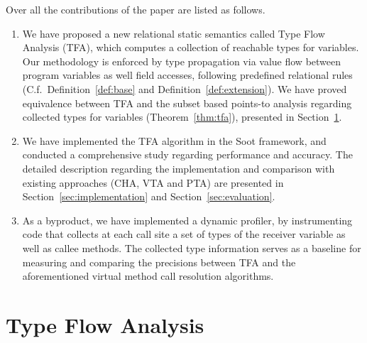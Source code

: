 \documentclass{fac}
\begin{document}
Over all the contributions of the paper are listed as follows.
\begin{enumerate}
  \item We have proposed a new relational static semantics called Type Flow Analysis (TFA), which computes a collection of reachable types for variables. Our methodology is enforced by type propagation via value flow between program variables as well field accesses, following predefined relational rules (C.f.~Definition~\ref{def:base} and Definition~\ref{def:extension}). We have proved equivalence between TFA and the subset based points-to analysis regarding collected types for variables (Theorem~\ref{thm:tfa}), presented in Section~\ref{sec:type-flow-analysis}.
  \item We have implemented the TFA algorithm in the Soot framework, and conducted a comprehensive study regarding performance and accuracy. The detailed description regarding the implementation and comparison with existing approaches (CHA, VTA and PTA) are presented in Section~\ref{sec:implementation} and Section~\ref{sec:evaluation}.
  \item As a byproduct, we have implemented a dynamic profiler, by instrumenting code that collects at each call site a set of types of the receiver variable as well as callee methods. The collected type information serves as a baseline for measuring and comparing the precisions between TFA and the aforementioned virtual method call resolution algorithms.
\end{enumerate}

\section{Type Flow Analysis}\label{sec:type-flow-analysis}
\end{document}
